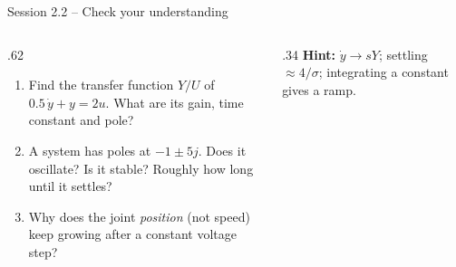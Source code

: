 \documentclass[aspectratio=169,10pt]{beamer}
\begin{document}
\begin{frame}{Session 2.2 -- Check your understanding}
\begin{columns}[T]
\begin{column}{.62\textwidth}
\begin{keybox}
\begin{enumerate}\setlength\itemsep{6pt}
\item Find the transfer function $Y/U$ of $0.5\,\dot y+y=2u$. What are its gain, time constant and pole?
\item A system has poles at $-1\pm 5j$. Does it oscillate? Is it stable? Roughly how long until it settles?
\item Why does the joint \emph{position} (not speed) keep growing after a constant voltage step?
\end{enumerate}
\end{keybox}
\end{column}
\begin{column}{.34\textwidth}
\small
\textbf{Hint:} $\dot y\rightarrow sY$; settling $\approx4/\sigma$; integrating a constant gives a ramp.
\end{column}
\end{columns}
\end{frame}
\end{document}
